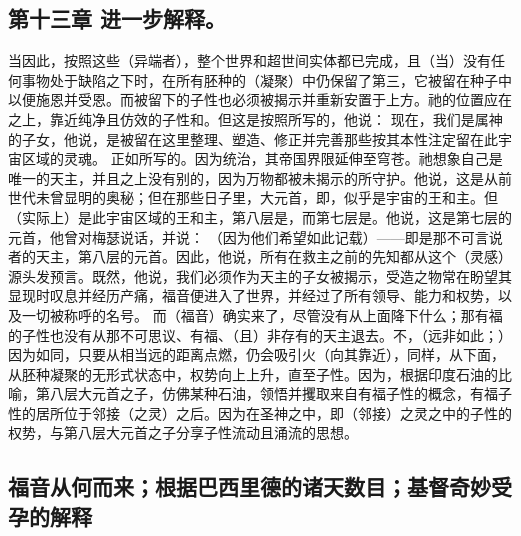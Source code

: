 
\subsection{第十三章 进一步解释。}

当因此，按照这些（异端者），整个世界和超世间实体都已完成，且（当）没有任何事物处于缺陷之下时，在所有胚种的（凝聚）中仍保留了第三，它被留在种子中以便施恩并受恩。而被留下的子性也必须被揭示并重新安置于上方。祂的位置应在之上，靠近纯净且仿效的子性和。但这是按照所写的，他说： 现在，我们是属神的子女，他说，是被留在这里整理、塑造、修正并完善那些按其本性注定留在此宇宙区域的灵魂。  正如所写的。因为统治，其帝国界限延伸至穹苍。祂想象自己是唯一的天主，并且之上没有别的，因为万物都被未揭示的所守护。他说，这是从前世代未曾显明的奥秘；但在那些日子里，大元首，即，似乎是宇宙的王和主。但（实际上）是此宇宙区域的王和主，第八层是，而第七层是。他说，这是第七层的元首，他曾对梅瑟说话，并说： （因为他们希望如此记载）——即是那不可言说者的天主，第八层的元首。因此，他说，所有在救主之前的先知都从这个（灵感）源头发预言。既然，他说，我们必须作为天主的子女被揭示，受造之物常在盼望其显现时叹息并经历产痛，福音便进入了世界，并经过了所有领导、能力和权势，以及一切被称呼的名号。 而（福音）确实来了，尽管没有从上面降下什么；那有福的子性也没有从那不可思议、有福、（且）非存有的天主退去。不，（远非如此；）因为如同，只要从相当远的距离点燃，仍会吸引火（向其靠近），同样，从下面，从胚种凝聚的无形式状态中，权势向上上升，直至子性。因为，根据印度石油的比喻，第八层大元首之子，仿佛某种石油，领悟并攫取来自有福子性的概念，有福子性的居所位于邻接（之灵）之后。因为在圣神之中，即（邻接）之灵之中的子性的权势，与第八层大元首之子分享子性流动且涌流的思想。\par


\subsection{福音从何而来；根据巴西里德的诸天数目；基督奇妙受孕的解释}

